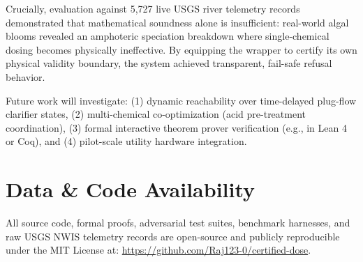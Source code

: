 \documentclass[10pt,twocolumn,letterpaper]{article}
\theoremstyle{definition}
\begin{document}
Crucially, evaluation against 5,727 live USGS river telemetry records demonstrated that mathematical soundness alone is insufficient: real-world algal blooms revealed an amphoteric speciation breakdown where single-chemical dosing becomes physically ineffective. By equipping the wrapper to certify its own physical validity boundary, the system achieved transparent, fail-safe refusal behavior.

Future work will investigate: (1) dynamic reachability over time-delayed plug-flow clarifier states, (2) multi-chemical co-optimization (acid pre-treatment coordination), (3) formal interactive theorem prover verification (e.g., in Lean 4 or Coq), and (4) pilot-scale utility hardware integration.

\section*{Data \& Code Availability}
All source code, formal proofs, adversarial test suites, benchmark harnesses, and raw USGS NWIS telemetry records are open-source and publicly reproducible under the MIT License at: \url{https://github.com/Raj123-0/certified-dose}.



\end{document}
